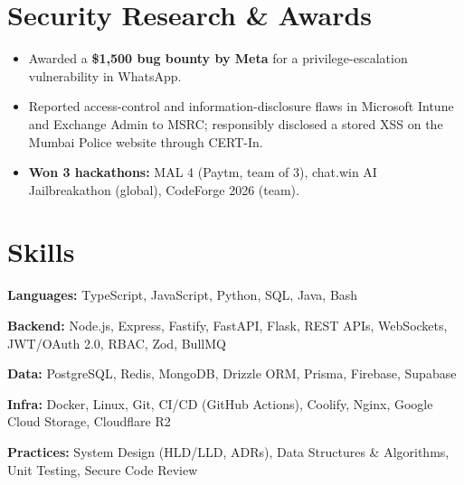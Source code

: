 \documentclass[10pt, a4paper]{article}
\begin{document}
\section{Security Research \& Awards}
\begin{itemize}
  \item Awarded a \textbf{\$1,500 bug bounty by Meta} for a privilege-escalation vulnerability in WhatsApp.
  \item Reported access-control and information-disclosure flaws in Microsoft Intune and Exchange Admin to MSRC;
  responsibly disclosed a stored XSS on the Mumbai Police website through CERT-In.
  \item \textbf{Won 3 hackathons:} MAL 4 (Paytm, team of 3), chat.win AI Jailbreakathon (global), CodeForge 2026 (team).
\end{itemize}

\section{Skills}
\textbf{Languages:} TypeScript, JavaScript, Python, SQL, Java, Bash\par
\textbf{Backend:} Node.js, Express, Fastify, FastAPI, Flask, REST APIs, WebSockets, JWT/OAuth 2.0, RBAC, Zod, BullMQ\par
\textbf{Data:} PostgreSQL, Redis, MongoDB, Drizzle ORM, Prisma, Firebase, Supabase\par
\textbf{Infra:} Docker, Linux, Git, CI/CD (GitHub Actions), Coolify, Nginx, Google Cloud Storage, Cloudflare R2\par
\textbf{Practices:} System Design (HLD/LLD, ADRs), Data Structures \& Algorithms, Unit Testing, Secure Code Review
\end{document}
